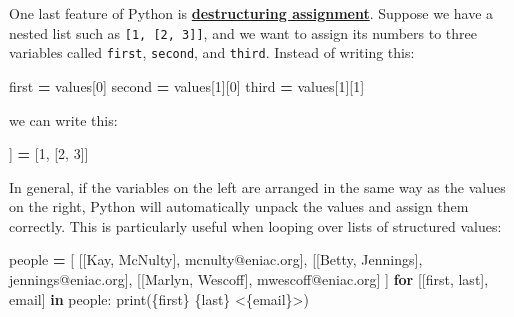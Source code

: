 \documentclass[
]{krantz}
\makeatletter
\newenvironment{Shaded}{\begin{snugshade}}{\end{snugshade}}
\newcommand{\BuiltInTok}[1]{#1}
\newcommand{\ControlFlowTok}[1]{\textcolor[rgb]{0.13,0.29,0.53}{\textbf{#1}}}
\newcommand{\DecValTok}[1]{\textcolor[rgb]{0.00,0.00,0.81}{#1}}
\newcommand{\KeywordTok}[1]{\textcolor[rgb]{0.13,0.29,0.53}{\textbf{#1}}}
\newcommand{\NormalTok}[1]{#1}
\newcommand{\OperatorTok}[1]{\textcolor[rgb]{0.81,0.36,0.00}{\textbf{#1}}}
\newcommand{\SpecialCharTok}[1]{\textcolor[rgb]{0.00,0.00,0.00}{#1}}
\newcommand{\StringTok}[1]{\textcolor[rgb]{0.31,0.60,0.02}{#1}}
\newenvironment{kframe}{%
\medskip{}
\setlength{\fboxsep}{.8em}
 \def\at@end@of@kframe{}%
 \ifinner\ifhmode%
  \def\at@end@of@kframe{\end{minipage}}%
  \begin{minipage}{\columnwidth}%
 \fi\fi%
 \def\FrameCommand##1{\hskip\@totalleftmargin \hskip-\fboxsep
 \colorbox{shadecolor}{##1}\hskip-\fboxsep
     \hskip-\linewidth \hskip-\@totalleftmargin \hskip\columnwidth}%
 \MakeFramed {\advance\hsize-\width
   \@totalleftmargin\z@ \linewidth\hsize
   \@setminipage}}%
 {\par\unskip\endMakeFramed%
 \at@end@of@kframe}
\renewenvironment{Shaded}{\begin{kframe}}{\end{kframe}}
\newcommand{\gref}[2]{\hyperlink{#2}{\textbf{#1}}}
\makeatother
\begin{document}
One last feature of Python is
\gref{destructuring assignment}{destructuring\_assignment}.
Suppose we have a nested list such as \texttt{{[}1,\ {[}2,\ 3{]}{]}},
and we want to assign its numbers to three variables
called \texttt{first}, \texttt{second}, and \texttt{third}.
Instead of writing this:

\begin{Shaded}
\begin{Highlighting}[]
\NormalTok{first }\OperatorTok{=}\NormalTok{ values[}\DecValTok{0}\NormalTok{]}
\NormalTok{second }\OperatorTok{=}\NormalTok{ values[}\DecValTok{1}\NormalTok{][}\DecValTok{0}\NormalTok{]}
\NormalTok{third }\OperatorTok{=}\NormalTok{ values[}\DecValTok{1}\NormalTok{][}\DecValTok{1}\NormalTok{]}
\end{Highlighting}
\end{Shaded}

we can write this:

\begin{Shaded}
\begin{Highlighting}[]
\NormalTok{[first, [second, third]] }\OperatorTok{=}\NormalTok{ [}\DecValTok{1}\NormalTok{, [}\DecValTok{2}\NormalTok{, }\DecValTok{3}\NormalTok{]]}
\end{Highlighting}
\end{Shaded}

In general,
if the variables on the left are arranged in the same way as the values on the right,
Python will automatically unpack the values and assign them correctly.
This is particularly useful when looping over lists of structured values:

\begin{Shaded}
\begin{Highlighting}[]
\NormalTok{people }\OperatorTok{=}\NormalTok{ [}
\NormalTok{    [[}\StringTok{\textquotesingle{}Kay\textquotesingle{}}\NormalTok{, }\StringTok{\textquotesingle{}McNulty\textquotesingle{}}\NormalTok{], }\StringTok{\textquotesingle{}mcnulty@eniac.org\textquotesingle{}}\NormalTok{],}
\NormalTok{    [[}\StringTok{\textquotesingle{}Betty\textquotesingle{}}\NormalTok{, }\StringTok{\textquotesingle{}Jennings\textquotesingle{}}\NormalTok{], }\StringTok{\textquotesingle{}jennings@eniac.org\textquotesingle{}}\NormalTok{],}
\NormalTok{    [[}\StringTok{\textquotesingle{}Marlyn\textquotesingle{}}\NormalTok{, }\StringTok{\textquotesingle{}Wescoff\textquotesingle{}}\NormalTok{], }\StringTok{\textquotesingle{}mwescoff@eniac.org\textquotesingle{}}\NormalTok{]}
\NormalTok{]}
\ControlFlowTok{for}\NormalTok{ [[first, last], email] }\KeywordTok{in}\NormalTok{ people:}
    \BuiltInTok{print}\NormalTok{(}\StringTok{\textquotesingle{}}\SpecialCharTok{\{first\}}\StringTok{ }\SpecialCharTok{\{last\}}\StringTok{ \textless{}}\SpecialCharTok{\{email\}}\StringTok{\textgreater{}\textquotesingle{}}\NormalTok{)}
\end{Highlighting}
\end{Shaded}
\end{document}
